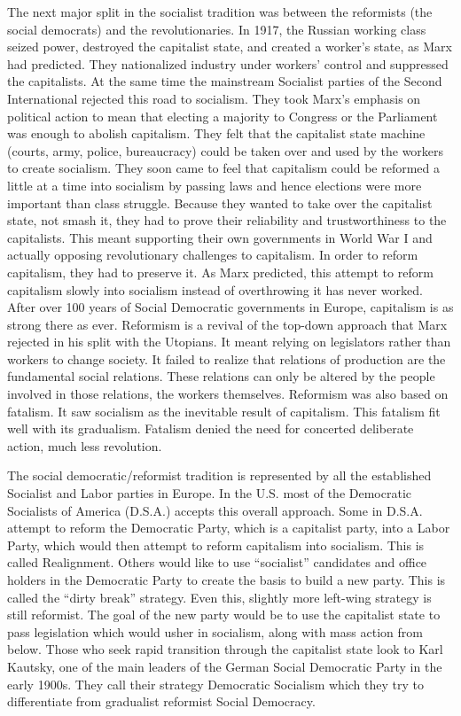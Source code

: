The next major split in the socialist tradition was between the reformists (the social democrats) and the revolutionaries. In 1917, the Russian working class seized power, destroyed the capitalist state, and created a worker's state, as Marx had predicted. They nationalized industry under workers' control and suppressed the capitalists. At the same time the mainstream Socialist parties of the Second International rejected this road to socialism. They took Marx's emphasis on political action to mean that electing a majority to Congress or the Parliament was enough to abolish capitalism. They felt that the capitalist state machine (courts, army, police, bureaucracy) could be taken over and used by the workers to create socialism. They soon came to feel that capitalism could be reformed a little at a time into socialism by passing laws and hence elections were more important than class struggle. Because they wanted to take over the capitalist state, not smash it, they had to prove their reliability and trustworthiness to the capitalists. This meant supporting their own governments in World War I and actually opposing revolutionary challenges to capitalism. In order to reform capitalism, they had to preserve it. As Marx predicted, this attempt to reform capitalism slowly into socialism instead of overthrowing it has never worked. After over 100 years of Social Democratic governments in Europe, capitalism is as strong there as ever. Reformism is a revival of the top-down approach that Marx rejected in his split with the Utopians. It meant relying on legislators rather than workers to change society. It failed to realize that relations of production are the fundamental social relations. These relations can only be altered by the people involved in those relations, the workers themselves. Reformism was also based on fatalism. It saw socialism as the inevitable result of capitalism. This fatalism fit well with its gradualism. Fatalism denied the need for concerted deliberate action, much less revolution.

The social democratic/reformist tradition is represented by all the established Socialist and Labor parties in Europe. In the U.S. most of the Democratic Socialists of America (D.S.A.) accepts this overall approach. Some in D.S.A. attempt to reform the Democratic Party, which is a capitalist party, into a Labor Party, which would then attempt to reform capitalism into socialism. This is called Realignment. Others would like to use ``socialist'' candidates and office holders in the Democratic Party to create the basis to build a new party. This is called the ``dirty break'' strategy. Even this, slightly more left-wing strategy is still reformist. The goal of the new party would be to use the capitalist state to pass legislation which would usher in socialism, along with mass action from below. Those who seek rapid transition through the capitalist state look to Karl Kautsky, one of the main leaders of the German Social Democratic Party in the early 1900s. They call their strategy Democratic Socialism which they try to differentiate from gradualist reformist Social Democracy.


